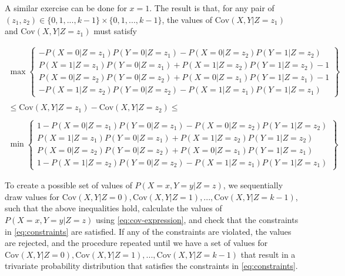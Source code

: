 \documentclass[
]{article}
\theoremstyle{plain}
\begin{document}
A similar exercise can be done for \(x = 1\). The result is that, for any pair of \((z_1, z_2) \in \{0,1,...,k-1\} \times \{0,1,...,k-1\}\), the values of \(\text{Cov}(X, Y | Z = z_1)\) and \(\text{Cov}(X, Y | Z = z_1)\) must satisfy

\[
\begin{aligned}
  \max\left\{ 
      \begin{array}{c}
        -P(X = 0 | Z = z_1)P(Y = 0 | Z = z_1) - P(X = 0 | Z = z_2)P(Y = 1 | Z = z_2) \\ 
        P(X = 1 | Z = z_1)P(Y = 0 | Z = z_1) + P(X = 1 | Z = z_2)P(Y = 1 | Z = z_2) -1 \\
        P(X = 0 | Z = z_2)P(Y = 0 | Z = z_2) + P(X = 0 | Z = z_1)P(Y = 1 | Z = z_1) - 1 \\
        -P(X = 1 | Z = z_2)P(Y = 0 | Z = z_2) - P(X = 1 | Z = z_1)P(Y = 1 | Z = z_1)
      \end{array} 
    \right\} \qquad \qquad & \\ \\
    \le \text{Cov}(X,Y | Z = z_1) - \text{Cov}(X,Y | Z = z_2) \le \qquad \qquad \qquad \qquad  \qquad& \\ \\
    \min\left\{ 
      \begin{array}{c}
        1 -P(X = 0 | Z = z_1)P(Y = 0 | Z = z_1) - P(X = 0 | Z = z_2)P(Y = 1 | Z = z_2) \\ 
        P(X = 1 | Z = z_1)P(Y = 0 | Z = z_1) + P(X = 1 | Z = z_2)P(Y = 1 | Z = z_2) \\
        P(X = 0 | Z = z_2)P(Y = 0 | Z = z_2) + P(X = 0 | Z = z_1)P(Y = 1 | Z = z_1) \\
        1 - P(X = 1 | Z = z_2)P(Y = 0 | Z = z_2) - P(X = 1 | Z = z_1)P(Y = 1 | Z = z_1)
      \end{array} 
    \right\} & 
\end{aligned}
\]

To create a possible set of values of \(P(X = x, Y = y | Z = z)\), we sequentially draw values for \(\text{Cov}(X, Y | Z = 0), \text{Cov}(X, Y | Z = 1), ..., \text{Cov}(X, Y | Z = k-1)\), such that the above inequalities hold, calculate the values of \(P(X = x, Y = y | Z = z)\) using \eqref{eq:cov-expression}, and check that the constraints in \eqref{eq:constraints} are satisfied. If any of the constraints are violated, the values are rejected, and the procedure repeated until we have a set of values for \(\text{Cov}(X, Y | Z = 0), \text{Cov}(X, Y | Z = 1), ..., \text{Cov}(X, Y | Z = k-1)\) that result in a trivariate probability distribution that satisfies the constraints in \eqref{eq:constraints}.
\end{document}
